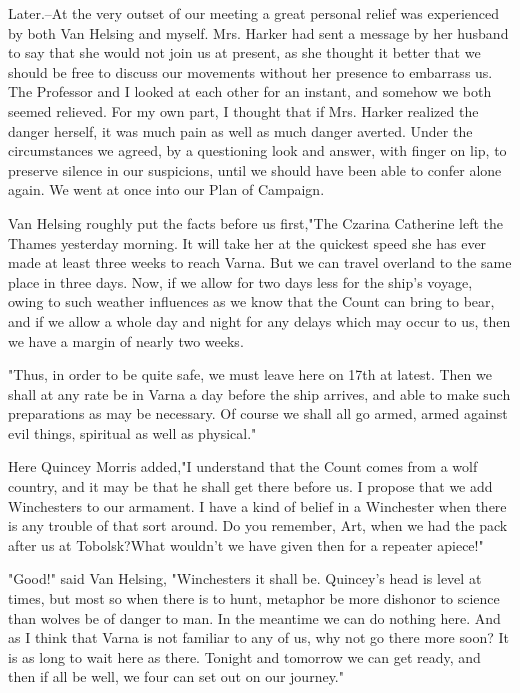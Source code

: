 Later.--At the very outset of our meeting a great personal relief was experienced by both Van Helsing and myself. Mrs. Harker had sent a message by her husband to say that she would not join us at present, as she thought it better that we should be free to discuss our movements without her presence to embarrass us. The Professor and I looked at each other for an instant, and somehow we both seemed relieved. For my own part, I thought that if Mrs. Harker realized the danger herself, it was much pain as well as much danger averted. Under the circumstances we agreed, by a questioning look and answer, with finger on lip, to preserve silence in our suspicions, until we should have been able to confer alone again. We went at once into our Plan of Campaign. 

Van Helsing roughly put the facts before us first,"The Czarina Catherine left the Thames yesterday morning. It will take her at the quickest speed she has ever made at least three weeks to reach Varna. But we can travel overland to the same place in three days. Now, if we allow for two days less for the ship's voyage, owing to such weather influences as we know that the Count can bring to bear, and if we allow a whole day and night for any delays which may occur to us, then we have a margin of nearly two weeks. 

"Thus, in order to be quite safe, we must leave here on 17th at latest. Then we shall at any rate be in Varna a day before the ship arrives, and able to make such preparations as may be necessary. Of course we shall all go armed, armed against evil things, spiritual as well as physical." 

Here Quincey Morris added,"I understand that the Count comes from a wolf country, and it may be that he shall get there before us. I propose that we add Winchesters to our armament. I have a kind of belief in a Winchester when there is any trouble of that sort around. Do you remember, Art, when we had the pack after us at Tobolsk?What wouldn't we have given then for a repeater apiece!" 

"Good!" said Van Helsing, "Winchesters it shall be. Quincey's head is level at times, but most so when there is to hunt, metaphor be more dishonor to science than wolves be of danger to man. In the meantime we can do nothing here. And as I think that Varna is not familiar to any of us, why not go there more soon? It is as long to wait here as there. Tonight and tomorrow we can get ready, and then if all be well, we four can set out on our journey." 

